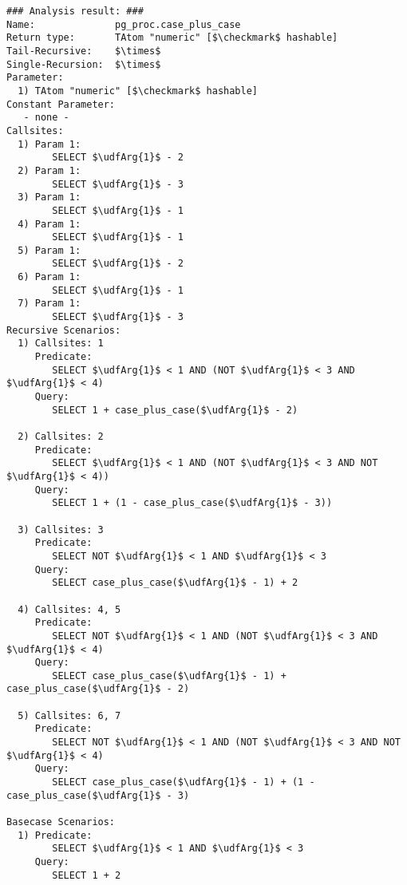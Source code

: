 \begin{lstlisting}[basicstyle=\ttfamily\scriptsize]
### Analysis result: ###
Name:              pg_proc.case_plus_case
Return type:       TAtom "numeric" [$\checkmark$ hashable]
Tail-Recursive:    $\times$
Single-Recursion:  $\times$
Parameter:
  1) TAtom "numeric" [$\checkmark$ hashable]
Constant Parameter:
   - none -
Callsites:
  1) Param 1:
        SELECT $\udfArg{1}$ - 2 
  2) Param 1:
        SELECT $\udfArg{1}$ - 3 
  3) Param 1:
        SELECT $\udfArg{1}$ - 1 
  4) Param 1:
        SELECT $\udfArg{1}$ - 1 
  5) Param 1:
        SELECT $\udfArg{1}$ - 2 
  6) Param 1:
        SELECT $\udfArg{1}$ - 1 
  7) Param 1:
        SELECT $\udfArg{1}$ - 3 
Recursive Scenarios:
  1) Callsites: 1
     Predicate:
        SELECT $\udfArg{1}$ < 1 AND (NOT $\udfArg{1}$ < 3 AND $\udfArg{1}$ < 4)
     Query:
        SELECT 1 + case_plus_case($\udfArg{1}$ - 2)

  2) Callsites: 2
     Predicate:
        SELECT $\udfArg{1}$ < 1 AND (NOT $\udfArg{1}$ < 3 AND NOT $\udfArg{1}$ < 4)) 
     Query:
        SELECT 1 + (1 - case_plus_case($\udfArg{1}$ - 3))

  3) Callsites: 3
     Predicate:
        SELECT NOT $\udfArg{1}$ < 1 AND $\udfArg{1}$ < 3
     Query:
        SELECT case_plus_case($\udfArg{1}$ - 1) + 2

  4) Callsites: 4, 5
     Predicate:
        SELECT NOT $\udfArg{1}$ < 1 AND (NOT $\udfArg{1}$ < 3 AND $\udfArg{1}$ < 4) 
     Query:
        SELECT case_plus_case($\udfArg{1}$ - 1) + case_plus_case($\udfArg{1}$ - 2)

  5) Callsites: 6, 7
     Predicate:
        SELECT NOT $\udfArg{1}$ < 1 AND (NOT $\udfArg{1}$ < 3 AND NOT $\udfArg{1}$ < 4)
     Query:
        SELECT case_plus_case($\udfArg{1}$ - 1) + (1 - case_plus_case($\udfArg{1}$ - 3)

Basecase Scenarios:
  1) Predicate:
        SELECT $\udfArg{1}$ < 1 AND $\udfArg{1}$ < 3 
     Query:
        SELECT 1 + 2
\end{lstlisting}